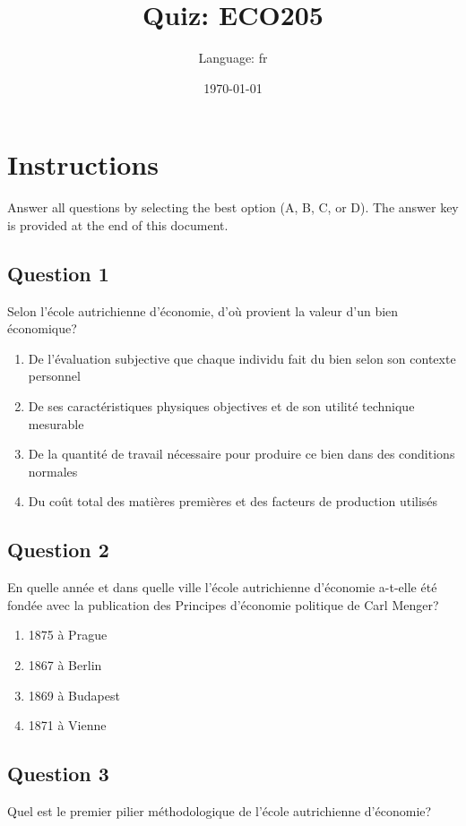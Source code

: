 \documentclass[12pt,a4paper]{article}
\title{Quiz: ECO205}
\author{Language: fr}
\date{\today}
\begin{document}
\maketitle
\thispagestyle{fancy}

\section*{Instructions}
Answer all questions by selecting the best option (A, B, C, or D). The answer key is provided at the end of this document.

\bigskip


\subsection*{Question 1}
Selon l'école autrichienne d'économie, d'où provient la valeur d'un bien économique?

\begin{enumerate}[label=\Alph*., leftmargin=*]
\item De l'évaluation subjective que chaque individu fait du bien selon son contexte personnel
\item De ses caractéristiques physiques objectives et de son utilité technique mesurable
\item De la quantité de travail nécessaire pour produire ce bien dans des conditions normales
\item Du coût total des matières premières et des facteurs de production utilisés
\end{enumerate}

\bigskip


\subsection*{Question 2}
En quelle année et dans quelle ville l'école autrichienne d'économie a-t-elle été fondée avec la publication des Principes d'économie politique de Carl Menger?

\begin{enumerate}[label=\Alph*., leftmargin=*]
\item 1875 à Prague
\item 1867 à Berlin
\item 1869 à Budapest
\item 1871 à Vienne
\end{enumerate}

\bigskip


\subsection*{Question 3}
Quel est le premier pilier méthodologique de l'école autrichienne d'économie?
\end{document}
